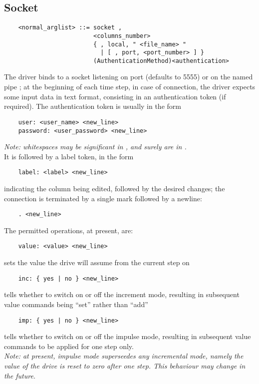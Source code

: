 \subsection{Socket}
\begin{verbatim}
    <normal_arglist> ::= socket , 
                         <columns_number>
                         { , local, " <file_name> " 
                           | [ , port, <port_number> ] }
                         (AuthenticationMethod)<authentication>
\end{verbatim}
The driver binds to a socket listening on port  
(defaults to 5555) or on the named pipe ; at the
beginning of each time step, in case of connection, the driver expects some
input data in text format, consisting in an authentication token 
(if required).
The authentication token is usually in the form
\begin{verbatim}
    user: <user_name> <new_line>
    password: <user_password> <new_line>
\end{verbatim}
{\em 
    Note: whitespaces may be significant in , 
    and surely are in .
} \\    
It is followed by a label token, in the form
\begin{verbatim}
    label: <label> <new_line>
\end{verbatim}
indicating the column being edited, followed by the desired changes; 
the connection is terminated by a single mark followed by a newline:
\begin{verbatim}
    . <new_line>
\end{verbatim}
The permitted operations, at present, are:
\begin{verbatim}
    value: <value> <new_line>
\end{verbatim}
sets the value the drive will assume from the current step on
\begin{verbatim}
    inc: { yes | no } <new_line>
\end{verbatim}
tells whether to switch on or off the increment mode, resulting in
subsequent value commands being ``set'' rather than ``add''
\begin{verbatim}
    imp: { yes | no } <new_line>
\end{verbatim}
tells whether to switch on or off the impulse mode, resulting in subsequent
value commands to be applied for one step only. \\
{\em 
    Note: at present, impulse mode superseedes any incremental mode, namely
    the value of the drive is reset to zero after one step.
    This behaviour may change in the future.
}


